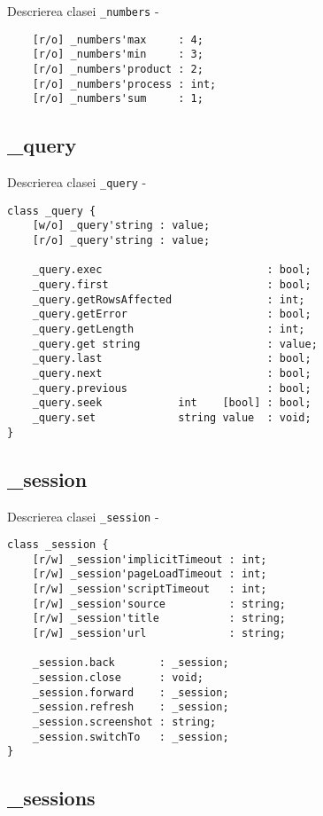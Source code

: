 \noindent Descrierea clasei \texttt{\_numbers} -
\begin{verbatim}
	[r/o] _numbers'max     : 4;
	[r/o] _numbers'min     : 3;
	[r/o] _numbers'product : 2;
	[r/o] _numbers'process : int;
	[r/o] _numbers'sum     : 1;
\end{verbatim}

\subsection{{\color{orange} \_query}}

\noindent Descrierea clasei \texttt{\_query} -
\begin{verbatim}
class _query {
	[w/o] _query'string : value;
	[r/o] _query'string : value;
	
	_query.exec                          : bool;
	_query.first                         : bool;
	_query.getRowsAffected               : int;
	_query.getError                      : bool;
	_query.getLength                     : int;
	_query.get string                    : value;
	_query.last                          : bool;
	_query.next                          : bool;
	_query.previous                      : bool;
	_query.seek            int    [bool] : bool;
	_query.set             string value  : void;
}
\end{verbatim}

\subsection{{\color{orange} \_session}}

\noindent Descrierea clasei \texttt{\_session} -
\begin{verbatim}
class _session {
	[r/w] _session'implicitTimeout : int;
	[r/w] _session'pageLoadTimeout : int;
	[r/w] _session'scriptTimeout   : int;
	[r/w] _session'source          : string;
	[r/w] _session'title           : string;
	[r/w] _session'url             : string;
	
	_session.back       : _session;
	_session.close      : void;
	_session.forward    : _session;
	_session.refresh    : _session;
	_session.screenshot : string;
	_session.switchTo   : _session;
}
\end{verbatim}

\subsection{{\color{orange} \_sessions}}

